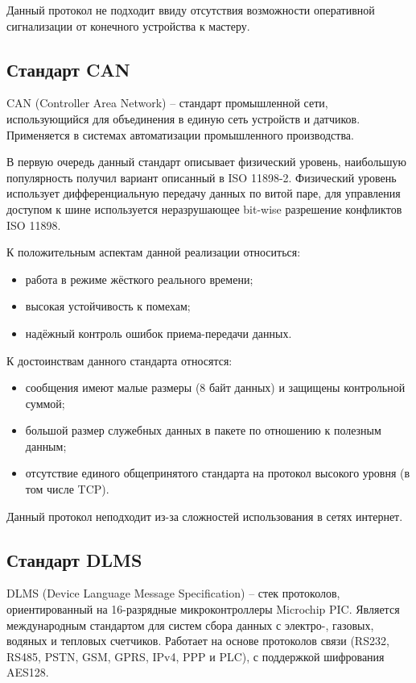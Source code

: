 Данный протокол не подходит ввиду отсутствия возможности оперативной сигнализации от конечного устройства к мастеру.

\subsection{Стандарт CAN}

CAN (Controller Area Network) – стандарт промышленной сети, использующийся для объединения в единую сеть устройств и датчиков. Применяется в системах автоматизации промышленного производства. 

В первую очередь данный стандарт описывает физический уровень, наибольшую популярность получил вариант описанный в ISO 11898-2. Физический уровень использует дифференциальную передачу данных по витой паре, для управления доступом к шине используется неразрушающее bit-wise разрешение конфликтов ISO 11898.

К положительным аспектам данной реализации относиться:

\begin{itemize}
 \item работа в режиме жёсткого реального времени;
 \item высокая устойчивость к помехам;
 \item надёжный контроль ошибок приема-передачи данных.
\end{itemize}

К достоинствам данного стандарта относятся:

\begin{itemize}
 \item сообщения имеют малые размеры (8 байт данных) и защищены контрольной суммой;
 \item большой размер служебных данных в пакете по отношению к полезным данным;
 \item отсутствие единого общепринятого стандарта на протокол высокого уровня (в том числе TCP).
\end{itemize}

Данный протокол неподходит из-за сложностей использования в сетях интернет.

\subsection{Стандарт DLMS}

DLMS (Device Language Message Specification) – стек протоколов, ориентированный на 16-разрядные микроконтроллеры Microchip PIC. Является международным стандартом для систем сбора данных с электро-, газовых, водяных и тепловых счетчиков. Работает на основе протоколов связи (RS232, RS485, PSTN, GSM, GPRS, IPv4, PPP и PLC), с поддержкой шифрования AES128.

